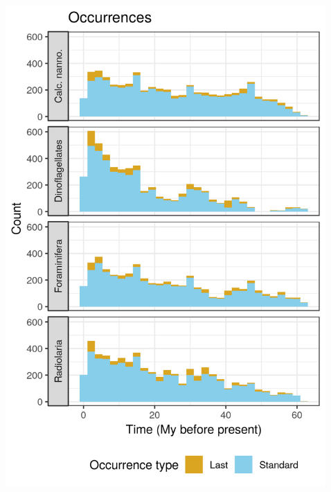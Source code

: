 \documentclass{beamer}
\begin{document}
\begin{frame}
\begin{columns}
\begin{column}{0.1\textwidth}
\begin{center}
      \end{center}
    \end{column}
    \begin{column}{0.4\textwidth}
      \includegraphics[width=\textwidth,height=0.8\textheight,keepaspectratio=true]{../results/figure/occ_time_label}
    \end{column}
    \begin{column}{0.4\textwidth}

\end{column}
\end{columns}
\end{frame}
\end{document}
